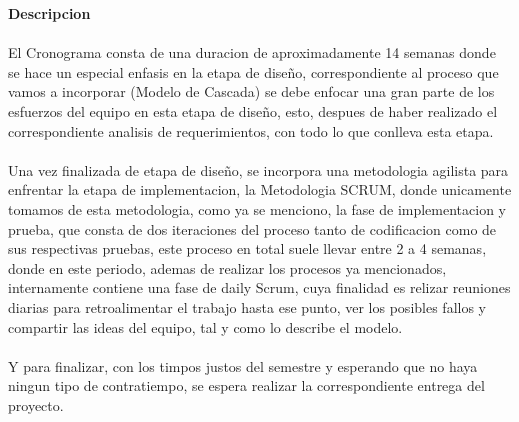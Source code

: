 \large \textbf{Descripcion}  \\
\\
El Cronograma consta de una duracion de aproximadamente 14 semanas donde se hace un especial enfasis en la etapa de diseño, correspondiente al proceso que vamos a incorporar (Modelo de Cascada) se debe enfocar una gran parte de los esfuerzos del equipo en esta etapa de diseño, esto, despues de haber realizado el correspondiente analisis de requerimientos, con todo lo que conlleva esta etapa.
\\
\\
Una vez finalizada de etapa de diseño, se incorpora una metodologia agilista para enfrentar la etapa de implementacion, la Metodologia SCRUM, donde unicamente tomamos de esta metodologia, como ya se menciono, la fase de implementacion y prueba, que consta de dos iteraciones del proceso tanto de codificacion como de sus respectivas pruebas, este proceso en total suele llevar entre 2 a 4 semanas, donde en este periodo, ademas de realizar los procesos ya mencionados, internamente contiene una fase de daily Scrum, cuya finalidad es relizar reuniones diarias para retroalimentar el trabajo hasta ese punto, ver los posibles fallos y compartir las ideas del equipo, tal y como lo describe el modelo.
\\
\\
Y para finalizar, con los timpos justos del semestre y esperando que no haya ningun tipo de contratiempo, se espera realizar la correspondiente entrega del proyecto.
\newpage